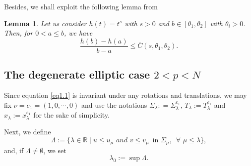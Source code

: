 \documentclass[12pt]{amsart}
\newtheorem{lem}[thm]{Lemma}
\theoremstyle{definition}
\theoremstyle{remark}
\theoremstyle{conclusion}
\theoremstyle{conjecture}
\numberwithin{equation}{section}
\newcommand{\R}{\mathbb{R}}
\begin{document}
Besides, we shall exploit the following lemma from \cite{EFRS}
\begin{lem}\label{tip}
     Let us consider $h(t)=t^s$ with $s>0$ and $b\in [\theta_1, \theta_2]$ with $\theta_i>0$. Then, for $0<a\leq b$, we have
    $$\frac{h(b)-h(a)}{b-a}\leq \overline{C}(s,\theta_1, \theta_2 ).$$
\end{lem}


\smallskip



\subsection{The degenerate elliptic case $2<p<N$}\label{sc4.1}

Since equation \eqref{eq1.1} is invariant under any rotations and translations, we may fix $\nu=e_1=(1,0,\cdots,0)$ and use the notations $\Sigma_\lambda: =\Sigma_\lambda^{e_1}$, $T_\lambda:=T_\lambda^{e_1}$ and $x_\lambda :=x_\lambda^{e_1}$ for the sake of simplicity.

Next, we define
$$ \Lambda:=\{ \lambda \in \R \mid u\leq u_\mu\, \, and \,\, v\leq v_\mu \,\,\, \mbox{in}\,\,\Sigma_\mu,\,\,\,\forall \,\, \mu \leq \lambda \},$$
and, if $\Lambda\neq\emptyset$, we set
$$\lambda_0 := \sup \Lambda.$$
\end{document}
